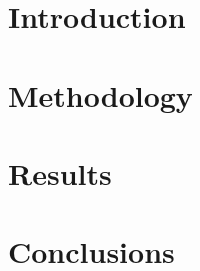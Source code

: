 



    
    
    \section{Introduction}
    
    
    \section{Methodology}
    

    \section{Results}
    

    \section{Conclusions}
    

    
    

